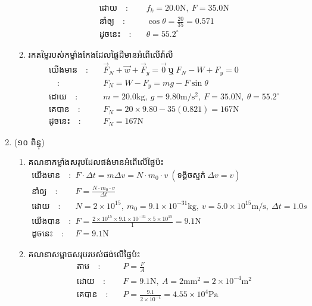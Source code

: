 \documentclass{classes/exam}
\begin{document}
\begin{enumerate}[I]
\begin{enumerate}[k]
\begin{align*}
				\text{ដោយ}\quad :&\quad f_{k}=20.0\si{\newton},~F=35.0\si{\newton}\\
				\text{នាំឲ្យ}\quad :&\quad \cos\theta=\frac{20}{35}=0.571\\
				\text{ដូចនេះ}\quad :&\quad \theta =55.2^\circ
			\end{align*}
			\item រកតម្លៃរបស់កម្លាំងកែងដែលផ្ទៃដីមានអំពើលើវ៉ាលី
			\begin{align*}
				\text{យើងមាន}\quad :&\quad \overrightarrow{F}_{N}+\overrightarrow{w}+\overrightarrow{F}_{y}=\vec{0}~\text{ឬ}~F_{N}-W+F_{y}=0\\
				\quad :&\quad F_{N}=W-F_{y}=mg-F\sin\theta\\
				\text{ដោយ}\quad :&\quad m=20.0\si{\kilogram},~g=9.80\si{\metre/\second^{2}},~F=35.0\si{\newton},~\theta =55.2^\circ\\
				\text{គេបាន}\quad :&\quad F_N=20\times 9.80-35\left(0.821\right)=167\si{\newton}\\
				\text{ដូចនេះ}\quad :&\quad F_{N}=167\si{\newton}
			\end{align*}
		\end{enumerate}
		\item {\color{magenta}\ks (១០ ពិន្ទុ)}
		\begin{enumerate}[k]
			\item គណនាកម្លាំងសរុបដែលផង់មានអំពើលើផ្ទៃប៉ះ
			\begin{align*}
				\text{យើងមាន}\quad :&\quad F\cdot\Delta t=m\Delta v=N\cdot m_{0}\cdot v~\left(\text{ទង្គិចស្ទក់}~\Delta v=v\right)\\
				\text{នាំឲ្យ}\quad :&\quad F=\frac{N\cdot m_{0}\cdot v}{\Delta t}\\
				\text{ដោយ}\quad :&\quad N=2\times 10^{15},~m_{0}=9.1\times 10^{-31}\si{\kilogram},~v=5.0\times 10^{15}\si{\metre/\second},~\Delta t=1.0s\\
				\text{យើងបាន}\quad :&\quad F=\frac{2\times 10^{15}\times 9.1\times 10^{-31}\times 5\times 10^{15}}{1}=9.1\si{\newton}\\
				\text{ដូចនេះ}\quad :&\quad F=9.1\si{\newton}
			\end{align*}
			\item គណនាសម្ពាធសរុបរបស់ផង់លើផ្ទៃប៉ះ
			\begin{align*}
				\text{តាម}\quad :&\quad P=\frac{F}{A}\\
				\text{ដោយ}\quad :&\quad F=9.1\si{\newton},~A=2\si{\milli \metre^{2}}=2\times 10^{-4}\si{\metre^{2}}\\
				\text{គេបាន}\quad :&\quad P=\frac{9.1}{2\times 10^{-4}}=4.55\times 10^{4}\si{\pascal}\\

\end{align*}
\end{enumerate}
\end{enumerate}
\end{document}
